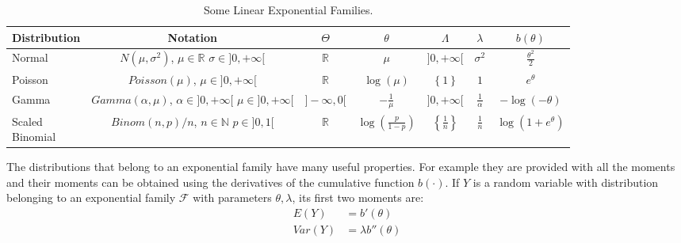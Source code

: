 \documentclass[a4paper, twoside, openright, 12pt]{report}
\theoremstyle{definition}
\theoremstyle{definition}
\theoremstyle{definition}
\theoremstyle{remark}
\begin{document}
\begin{table}[!h]

\caption{\label{tab:exp-families}Some Linear Exponential Families.}
\centering
\begin{tabular}[t]{lcccccc}
\toprule
\textbf{Distribution} & \textbf{Notation} & \textbf{$\Theta$} & \textbf{$\theta$} & \textbf{$\Lambda$} & \textbf{$\lambda$} & \textbf{$b(\theta)$}\\
\midrule[\heavyrulewidth]
Normal & \makecell[c]{$N(\mu, \sigma^2)$,\\$\mu\in\mathbb{R}$ \\ $\sigma \in ]0, +\infty[$} & $\mathbb{R}$ & $\mu$ & $]0, +\infty[$ & $\sigma^2$ & $\frac{\theta^2}{2}$\\
\addlinespace\hline\addlinespace
Poisson & \makecell[c]{$Poisson(\mu)$,\\$\mu \in ]0, +\infty[$} & $\mathbb{R}$ & $\log{(\mu)}$ & $\left\{1\right\}$ & $1$ & $e^{\theta}$\\
\addlinespace\hline\addlinespace
Gamma & \makecell[c]{$Gamma(\alpha, \mu)$,\\$\alpha \in ]0, +\infty[$ \\ $\mu \in ]0, +\infty[$} & $]-\infty, 0[$ & $-\frac{1}{\mu}$ & $]0,+\infty[$ & $\frac{1}{\alpha}$ & $-\log{\left(-\theta\right)}$\\
\addlinespace\hline\addlinespace
\makecell[l]{Scaled\\Binomial} & \makecell[c]{$Binom(n, p)/n$,\\$n\in\mathbb{N}$ \\ $p\in]0,1[$} & $\mathbb{R}$ & $\log{\left(\frac{p}{1-p}\right)}$ & $\left\{\frac{1}{n}\right\}$ & $\frac{1}{n}$ & $\log\left(1+e^{\theta}\right)$\\
\bottomrule
\end{tabular}
\end{table}

The distributions that belong to an exponential family have many useful properties. For example they are provided with all the moments and their moments can be obtained using the derivatives of the cumulative function \(b(\cdot)\). If \(Y\) is a random variable with distribution belonging to an exponential family \(\mathcal{F}\) with parameters \(\theta, \lambda\), its first two moments are:
\begin{align}
\label{eq:exp-fam-expected-value}
E(Y)   & = b'(\theta) \\
Var(Y) & = \lambda b''(\theta)
\end{align}
\end{document}
